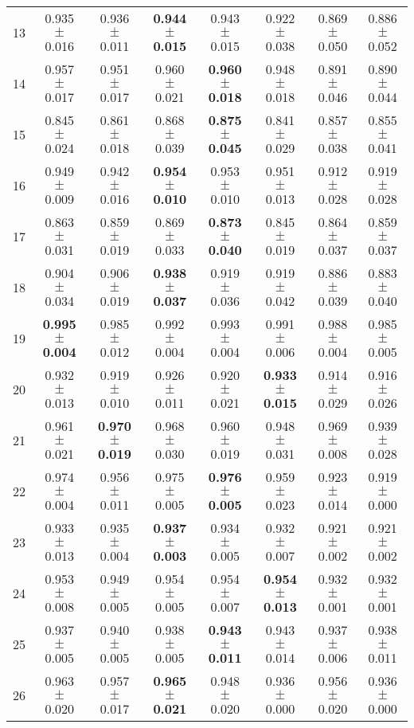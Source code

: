 \begin{table}[!ht]
{\begin{tabular}{r c c c c c c c}
13 & 0.935 $\pm$ 0.016 & 0.936 $\pm$ 0.011 & \textbf{0.944 $\pm$ 0.015} & 0.943 $\pm$ 0.015 & 0.922 $\pm$ 0.038 & 0.869 $\pm$ 0.050 & 0.886 $\pm$ 0.052 \\
14 & 0.957 $\pm$ 0.017 & 0.951 $\pm$ 0.017 & 0.960 $\pm$ 0.021 & \textbf{0.960 $\pm$ 0.018} & 0.948 $\pm$ 0.018 & 0.891 $\pm$ 0.046 & 0.890 $\pm$ 0.044 \\
15 & 0.845 $\pm$ 0.024 & 0.861 $\pm$ 0.018 & 0.868 $\pm$ 0.039 & \textbf{0.875 $\pm$ 0.045} & 0.841 $\pm$ 0.029 & 0.857 $\pm$ 0.038 & 0.855 $\pm$ 0.041 \\
16 & 0.949 $\pm$ 0.009 & 0.942 $\pm$ 0.016 & \textbf{0.954 $\pm$ 0.010} & 0.953 $\pm$ 0.010 & 0.951 $\pm$ 0.013 & 0.912 $\pm$ 0.028 & 0.919 $\pm$ 0.028 \\
17 & 0.863 $\pm$ 0.031 & 0.859 $\pm$ 0.019 & 0.869 $\pm$ 0.033 & \textbf{0.873 $\pm$ 0.040} & 0.845 $\pm$ 0.019 & 0.864 $\pm$ 0.037 & 0.859 $\pm$ 0.037 \\
18 & 0.904 $\pm$ 0.034 & 0.906 $\pm$ 0.019 & \textbf{0.938 $\pm$ 0.037} & 0.919 $\pm$ 0.036 & 0.919 $\pm$ 0.042 & 0.886 $\pm$ 0.039 & 0.883 $\pm$ 0.040 \\
19 & \textbf{0.995 $\pm$ 0.004} & 0.985 $\pm$ 0.012 & 0.992 $\pm$ 0.004 & 0.993 $\pm$ 0.004 & 0.991 $\pm$ 0.006 & 0.988 $\pm$ 0.004 & 0.985 $\pm$ 0.005 \\
20 & 0.932 $\pm$ 0.013 & 0.919 $\pm$ 0.010 & 0.926 $\pm$ 0.011 & 0.920 $\pm$ 0.021 & \textbf{0.933 $\pm$ 0.015} & 0.914 $\pm$ 0.029 & 0.916 $\pm$ 0.026 \\
21 & 0.961 $\pm$ 0.021 & \textbf{0.970 $\pm$ 0.019} & 0.968 $\pm$ 0.030 & 0.960 $\pm$ 0.019 & 0.948 $\pm$ 0.031 & 0.969 $\pm$ 0.008 & 0.939 $\pm$ 0.028 \\
22 & 0.974 $\pm$ 0.004 & 0.956 $\pm$ 0.011 & 0.975 $\pm$ 0.005 & \textbf{0.976 $\pm$ 0.005} & 0.959 $\pm$ 0.023 & 0.923 $\pm$ 0.014 & 0.919 $\pm$ 0.000 \\
23 & 0.933 $\pm$ 0.013 & 0.935 $\pm$ 0.004 & \textbf{0.937 $\pm$ 0.003} & 0.934 $\pm$ 0.005 & 0.932 $\pm$ 0.007 & 0.921 $\pm$ 0.002 & 0.921 $\pm$ 0.002 \\
24 & 0.953 $\pm$ 0.008 & 0.949 $\pm$ 0.005 & 0.954 $\pm$ 0.005 & 0.954 $\pm$ 0.007 & \textbf{0.954 $\pm$ 0.013} & 0.932 $\pm$ 0.001 & 0.932 $\pm$ 0.001 \\
25 & 0.937 $\pm$ 0.005 & 0.940 $\pm$ 0.005 & 0.938 $\pm$ 0.005 & \textbf{0.943 $\pm$ 0.011} & 0.943 $\pm$ 0.014 & 0.937 $\pm$ 0.006 & 0.938 $\pm$ 0.011 \\
26 & 0.963 $\pm$ 0.020 & 0.957 $\pm$ 0.017 & \textbf{0.965 $\pm$ 0.021} & 0.948 $\pm$ 0.020 & 0.936 $\pm$ 0.000 & 0.956 $\pm$ 0.020 & 0.936 $\pm$ 0.000 \\

\end{tabular}}
\end{table}
